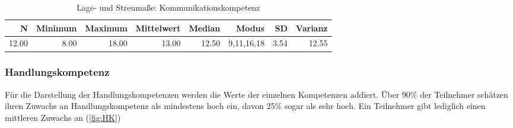 \documentclass[12pt, bibliography=totoc]{scrartcl}
\begin{document}
\begin{table}[H]
\centering
\caption{Lage- und Streumaße: Kommunikationskompetenz}
\label{tab:lKK}
\begin{tabular}{rrrrrrrr}
  \hline
  N & Minimum & Maximum & Mittelwert & Median & Modus & SD & Varianz \\
  \hline
 12.00 & 8.00 & 18.00 & 13.00 & 12.50 & 9,11,16,18 & 3.54 & 12.55 \\

\end{tabular}
\end{table}

\subsubsection{Handlungskompetenz}\label{handlungskompetenz-1}

Für die Darstellung der Handlungskompetenzen werden die Werte der
einzelnen Kompetenzen addiert. Über 90\% der Teilnehmer schätzen ihren
Zuwachs an Handlungskompetenz als mindestens hoch ein, davon 25\% sogar
als sehr hoch. Ein Teilnehmer gibt lediglich einen mittleren Zuwachs an
(\ref{fig:HK})
\end{document}
